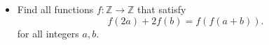 \documentclass[11pt]{scrartcl}
\begin{document}
\begin{itemize}[label=,itemsep=0.4em,leftmargin=0em]
\begin{comment}
    Let $P(x,y)$ be the assertion to $(1)$

    $P(x,y) \ra f(x^{2}f(y)^2)=f(x)^{2}f(y) $

    $P(1,x) \ra f(f(x)^2)=f(1)^{2}f(x)...(A)$

    $P(\displaystyle \frac{x}{f(x^2)},x^2) \ra f(x^2)=f(\frac{x}{f(x^2)})^{2}f(x^2)$ $\ra  f(\displaystyle \frac{x}{f(x^2)})=1$

    $\exists c\in \mathbb{Q^+}$ such that $f(c)=1$

    $P(x,c) \ra f(x^2)=f(x)^2$

    $P(x,y^2) \ra f(xf(y)^2)^2=f(x)^{2}f(y)^{2}$ $\ra f(xf(y)^2)=f(x)f(y) ... (1)$

    In (1) let $x=1$ and we obtain $f(f(y)^2)=f(1)f(y)...(B)$

    Combining (A) and (B) yields $f(1)=1$

    So $f(f(x)^2)= f(f(x))^2= f(x)$ $\ra f^k(x)=\sqrt[k]{f(x)}$ where $k$ is a power of $2$.

    Suppose that for some $a\in \mathbb{Q^+}$ such that $f(a)\neq 1$ let $f(a)=\displaystyle \frac{m}{n}$ such that $\gcd(m,n)=1$

    Let $k$ be a power of $2$ with $v_{p}(m)<k \wedge v_{p}(n)<k$ for all primes $p$.

    $f^k(a)=\sqrt[k]{f(a)}$ so $\sqrt[k]{f(a)} \in \mathbb{Q^+}$

    Let $\sqrt[k]{\displaystyle\frac{m}{n}}=\displaystyle\frac{x}{y}$ for some $x,y \in \mathbb{N}$ with $\gcd(x,y)=1$

    $my^k=nx^k$ if $p \mid m \ra p \mid x$

    $v_{p}(my^k)=v_{p}(nx^k)$ Since $\gcd(x,y)=1$ $v_{p}(y)=0$

    $v_{p}(my^k)=v_{p}(m)=v_{p}(x^k)=k \cdot v_{p}(x) \geq k$ this is clearly a contradiction and thus there doesn't exist any positive rational number $a$ with $f(a)\neq 1$.
    \end{comment}

    \item \begin{btvn}
        Find all functions $f: \mathbb{Z} \to \mathbb{Z}$ that satisfy
        $$f(2a)+2f(b)=f(f(a+b)).$$
        for all integers  $a,b$.
    \end{btvn}
    \begin{comment}
        Let $P(x,y)$ denote the substitution into $(1)$.

\vocab{Claim 1:} $f$ is strictly increasing over $\mathbb{R}^+$.
\begin{pro}
    First, we prove that $f$ is injective. By substituting $P(1,a)$ and $P(1,b)$ sequentially, we find that $a = b$.


\end{comment}
\end{itemize}
\end{document}
